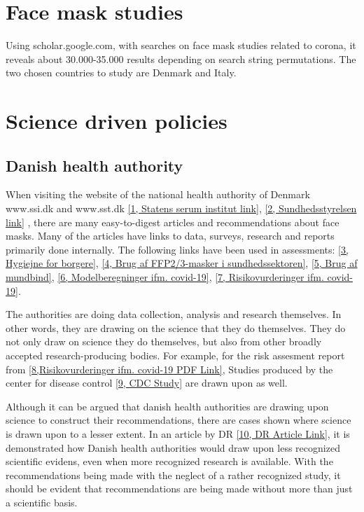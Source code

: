 \section*{Face mask studies}
Using scholar.google.com, with searches on face mask studies related to corona, it reveals about 30.000-35.000 results depending on search string permutations.
The two chosen countries to study are Denmark and Italy.

\section*{Science driven policies}
\subsection*{Danish health authority}
When visiting the website of the national health authority of Denmark www.ssi.dk and www.sst.dk \href{https://www.ssi.dk}{[1, Statens serum institut link]}, \href{https://www.sst.dk}{[2, Sundhedsstyrelsen link]} , there are many easy-to-digest articles and recommendations about face masks.
Many of the articles have links to data, surveys, research and reports primarily done internally. The following links have been used in assessments: 
\href{https://covid19.ssi.dk/hygiejne/borgere}{[3, Hygiejne for borgere]},
\href{https://www.ssi.dk/aktuelt/nyheder/2021/brug-af-ffp2-3-masker-i-sundhedssektoren}{[4, Brug af FFP2/3-masker i sundhedssektoren]},
\href{https://www.sst.dk/da/corona/Forebyg-smitte/Mundbind-og-barrierer}{[5, Brug af mundbind]}, 
\href{https://covid19.ssi.dk/analyser-og-prognoser/modelberegninger}{[6, Modelberegninger ifm. covid-19]}, 
\href{https://covid19.ssi.dk/analyser-og-prognoser/risikovurderinger}{[7, Risikovurderinger ifm. covid-19]}.

The authorities are doing data collection, analysis and research themselves. In other words, they are drawing on the science that they do themselves.
They do not only draw on science they do themselves, but also from other broadly accepted research-producing bodies.
For example, for the risk assesment report from \href{https://covid19.ssi.dk/-/media/arkiv/subsites/covid19/risikovurderinger/2022/opdatering-af-risikovurdering--ba4_ba5_ba2121---21062022.pdf?la=da}{[8,Risikovurderinger ifm. covid-19 PDF Link]},
Studies produced by the center for disease control \href{https://covid.cdc.gov/covid-data-tracker/#variant-proportions}{[9, CDC Study]} are drawn upon as well.

Although it can be argued that danish health authorities are drawing upon science to construct their recommendations, there are cases shown where science is drawn upon to a lesser extent.
In an article by DR \href{https://www.dr.dk/nyheder/viden/kroppen/nye-krav-om-mundbind-anbefalinger-hviler-paa-et-spinkelt-grundlag}{[10, DR Article Link]}, it is demonstrated how Danish health authorities would draw upon less recognized scientific evidens, even when more recognized research is available.
With the recommendations being made with the neglect of a rather recognized study, it should be evident that recommendations are being made without more than just a scientific basis.


